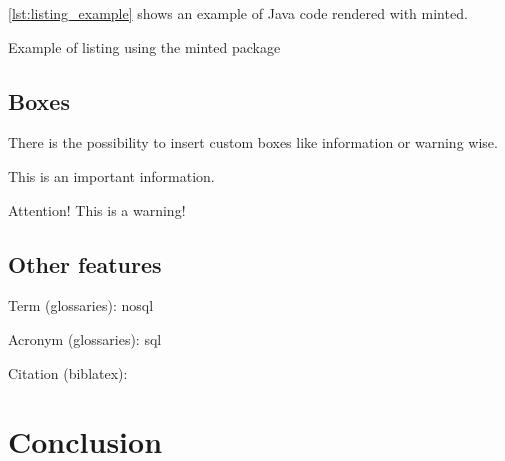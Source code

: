 \autoref{lst:listing_example} shows an example of Java code rendered with minted.

\begin{listing}[H]
    \caption{Example of listing using the minted package}
    \label{lst:listing_example}
\end{listing}

\subsection{Boxes}

There is the possibility to insert custom boxes like information or warning wise.

\begin{info}
    This is an important information.
\end{info}

\begin{warning}
    Attention! This is a warning!
\end{warning}

\subsection{Other features}

Term (glossaries): \gls{nosql}

Acronym (glossaries): \gls{sql}

Citation (biblatex): \cite{paper_millwheel}

\section{Conclusion}

\blindtext

